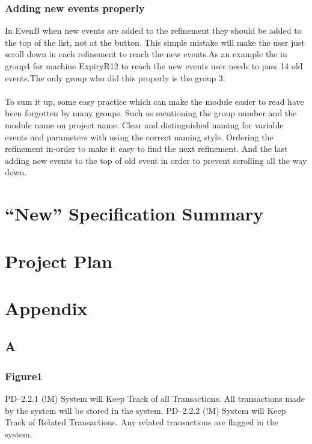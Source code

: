 \subsection{Adding new events properly}
\label{addingneweventsproperly}

In EvenB when new events are added to the refinement they should be added to the top of the list, not at the button. This simple mistake will make the user just scroll down in each refinement to reach the new events.As an example the in group4 for machine ExpiryR12 to reach the new events user needs to pass 14 old events.The only group who did this properly is the group 3.  \\ \\  To sum it up, some easy practice which can make the module easier to read have been forgotten by many groups. Such as mentioning the group number and the module name on project name. Clear and distinguished naming for variable events and parameters with using the correct naming style. Ordering the refinement in-order to make it easy to find the next refinement. And the last adding new events to the top of old event in order to prevent scrolling all the way down.

\chapter{``New'' Specification Summary}
\label{newspecificationsummary}

\chapter{Project Plan}
\label{projectplan}

\chapter{Appendix}
\label{appendix}

\section{A}
\label{a}

\subsection{Figure1}
\label{figure1}

PD--2.2.1 (!M) System will Keep Track of all Transactions.
All transactions made by the system will be stored in the system.
PD--2.2.2 (!M) System will Keep Track of Related Transactions.
Any related transactions are flagged in the system.

